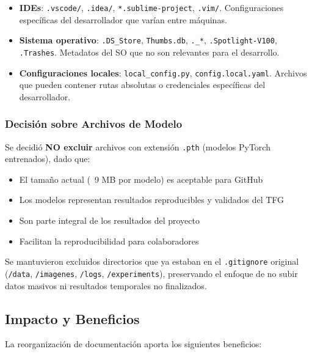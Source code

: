 \documentclass[12pt,a4paper]{article}
\begin{document}
\begin{itemize}
    \item \textbf{IDEs}: \texttt{.vscode/}, \texttt{.idea/}, \texttt{*.sublime-project}, \texttt{.vim/}. Configuraciones específicas del desarrollador que varían entre máquinas.
    
    \item \textbf{Sistema operativo}: \texttt{.DS\_Store}, \texttt{Thumbs.db}, \texttt{.\_*}, \texttt{.Spotlight-V100}, \texttt{.Trashes}. Metadatos del SO que no son relevantes para el desarrollo.
    
    \item \textbf{Configuraciones locales}: \texttt{local\_config.py}, \texttt{config.local.yaml}. Archivos que pueden contener rutas absolutas o credenciales específicas del desarrollador.
\end{itemize}

\subsubsection{Decisión sobre Archivos de Modelo}

Se decidió \textbf{NO excluir} archivos con extensión \texttt{.pth} (modelos PyTorch entrenados), dado que:

\begin{itemize}
    \item El tamaño actual (~9 MB por modelo) es aceptable para GitHub
    \item Los modelos representan resultados reproducibles y validados del TFG
    \item Son parte integral de los resultados del proyecto
    \item Facilitan la reproducibilidad para colaboradores
\end{itemize}

Se mantuvieron excluidos directorios que ya estaban en el \texttt{.gitignore} original (\texttt{/data}, \texttt{/imagenes}, \texttt{/logs}, \texttt{/experiments}), preservando el enfoque de no subir datos masivos ni resultados temporales no finalizados.

\subsection{Impacto y Beneficios}

La reorganización de documentación aporta los siguientes beneficios:
\end{document}
